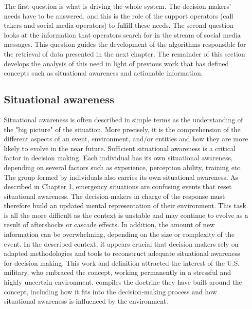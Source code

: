 The first question is what is driving the whole system.
The decision makers' needs have to be answered, and this is the role of the support operators (call takers and social media operators) to fulfill these needs.
The second question looks at the information that operators search for in the stream of social media messages.
This question guides the development of the algorithms responsible for the retrieval of data presented in the next chapter.
The remainder of this section develops the analysis of this need in light of previous work that
has defined concepts such as situational awareness and actionable information.

\subsection{Situational awareness}
Situational awareness is often described in simple terms as the understanding of the "big picture" of the situation.
More precisely, it is the comprehension of the different aspects of an event, environment, and/or entities and how they are more likely to evolve in the near future.
Sufficient situational awareness is a critical factor in decision making.
Each individual has its own situational awareness, depending on several factors such as experience, perception ability, training etc.
The group formed by individuals also carries its own situational awareness.
As described in Chapter 1, emergency situations are confusing events that reset situational awareness.
The decision-makers in charge of the response must therefore build an updated mental representation of their environment.
This task is all the more difficult as the context is unstable and may continue to evolve as a result of aftershocks or cascade effects.
In addition, the amount of new information can be overwhelming, depending on the size or complexity of the event.
In the described context, it appears crucial that decision makers rely on adapted methodologies and tools to reconstruct adequate situational awareness for decision making.
This work and definition attracted the interest of the U.S. military, who embraced the concept, working permanently in a stressful and highly uncertain environment.
\textcite{departmentofthearmyAdvancedSituationalAwareness2021} compiles the doctrine they have built around the concept, including how it fits into the decision-making process and how situational awareness is influenced by the environment.

